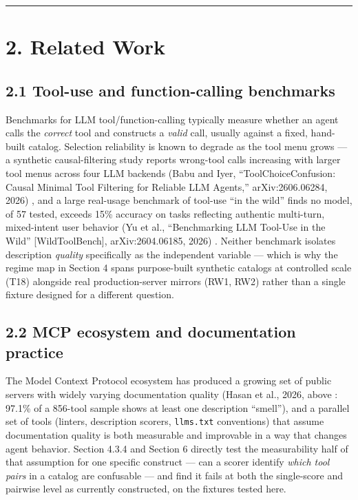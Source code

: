 \begin{center}\rule{0.5\linewidth}{0.5pt}\end{center}

\hypertarget{related-work}{%
\section{2. Related Work}\label{related-work}}

\hypertarget{tool-use-and-function-calling-benchmarks}{%
\subsection{2.1 Tool-use and function-calling
benchmarks}\label{tool-use-and-function-calling-benchmarks}}

Benchmarks for LLM tool/function-calling typically measure whether an
agent calls the \emph{correct} tool and constructs a \emph{valid} call,
usually against a fixed, hand-built catalog. Selection reliability is
known to degrade as the tool menu grows --- a synthetic causal-filtering
study reports wrong-tool calls increasing with larger tool menus across
four LLM backends (Babu and Iyer, ``ToolChoiceConfusion: Causal Minimal
Tool Filtering for Reliable LLM Agents,'' arXiv:2606.06284,
2026) \nocite{babu2026toolchoice}, and a
large real-usage benchmark of tool-use ``in the wild'' finds no model,
of 57 tested, exceeds 15\% accuracy on tasks reflecting authentic
multi-turn, mixed-intent user behavior (Yu et al., ``Benchmarking LLM
Tool-Use in the Wild'' {[}WildToolBench{]}, arXiv:2604.06185,
2026) \nocite{yu2026wildtool}.
Neither benchmark isolates description \emph{quality} specifically as
the independent variable --- which is why the regime map in Section 4
spans purpose-built synthetic catalogs at controlled scale (T18)
alongside real production-server mirrors (RW1, RW2) rather than a single
fixture designed for a different question.

\hypertarget{mcp-ecosystem-and-documentation-practice}{%
\subsection{2.2 MCP ecosystem and documentation
practice}\label{mcp-ecosystem-and-documentation-practice}}

The Model Context Protocol ecosystem has produced a growing set of
public servers with widely varying documentation quality (Hasan et al.,
2026, above \nocite{hasan2026smelly}: 97.1\% of a 856-tool sample shows at least one description
``smell''), and a parallel set of tools (linters, description scorers,
\texttt{llms.txt} conventions) that assume documentation quality is both
measurable and improvable in a way that changes agent behavior. Section
4.3.4 and Section 6 directly test the measurability half of that
assumption for one specific construct --- can a scorer identify
\emph{which tool pairs} in a catalog are confusable --- and find it
fails at both the single-score and pairwise level as currently
constructed, on the fixtures tested here.

